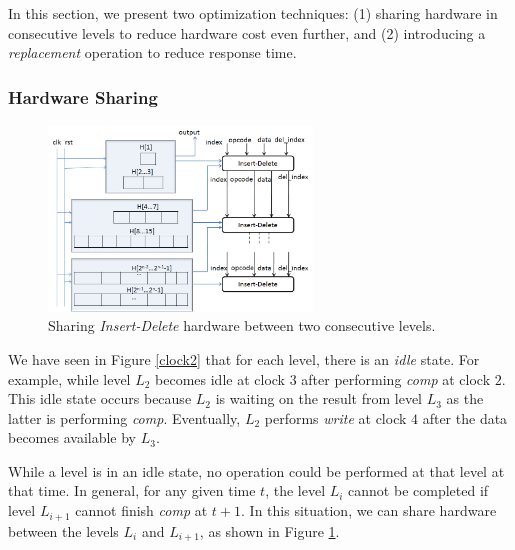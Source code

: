 \documentclass[10pt, conference, compsocconf]{IEEEtran}
\begin{document}
In this section, we present two optimization techniques: (1) sharing hardware in consecutive levels to reduce hardware cost even further, and (2) introducing a {\it replacement} operation to reduce response time.

\subsubsection{Hardware Sharing}
\begin{figure}[!ht]
  \centering
  \includegraphics[width=7cm]{Figures/d3.png}
      \caption{Sharing {\it Insert-Delete} hardware between two consecutive levels.}
    \label{d3}
\end{figure}

We have seen in Figure \ref{clock2} that for each level, there is an {\it idle} state.
For example, while level $L_2$ becomes idle at clock $3$ after performing {\it comp} at clock $2$.
This idle state occurs because $L_2$ is waiting on the result from level $L_3$ as the latter is performing {\it comp}.
Eventually, $L_2$ performs {\it write} at clock $4$ after the data becomes available by $L_3$.

While a level is in an idle state, no operation could be performed at that level at that time.
In general, for any given time $t$, the level $L_i$ cannot be completed if level $L_{i+1}$ cannot finish {\it comp} at $t+1$.
In this situation, we can share hardware between the levels $L_i$ and $L_{i+1}$, as shown in Figure \ref{d3}.
\end{document}
